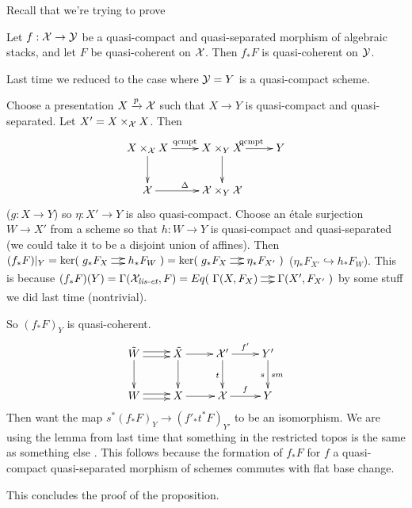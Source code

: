 
Recall that we're trying to prove
\begin{proposition}
  Let $f:\mathcal{X}\to \mathcal{Y}$ be a quasi-compact and quasi-separated morphism of
algebraic stacks, and let $F$ be quasi-coherent on $\mathcal{X}$. Then $f_*F$
is quasi-coherent on $\mathcal{Y}$.
\end{proposition}
Last time we reduced to the case where $\mathcal{Y}=Y$ is a quasi-compact
scheme.

Choose a presentation $X\xrightarrow p \mathcal{X}$ such that $X\to Y$ is
quasi-compact and quasi-separated. Let $X'=X\times_{\mathcal{X}} X$. Then
\[\xymatrix{
  X\times_\X X\ar[r]^{\text{qcmpt}}\ar[d] & X\times_Y X\ar[d]
\ar[r]^{\text{qcmpt}} & Y\\
  \X\ar[r]^\Delta & \X\times_Y \X
}\]
($g:X\to Y$) so $\eta:X'\to Y$ is also quasi-compact. Choose an
\'etale surjection $W\to X'$ from a scheme so that $h:W\to Y$ is
quasi-compact and quasi-separated (we could take it to be a disjoint
union of affines). Then $(f_*F)|_Y=\ker(\xymatrix@-1pc{g_*F_X
\ar@<.5ex>[r]\ar@<-.5ex>[r] & h_*F_W}) = \ker(\xymatrix@-1pc{g_*F_X
\ar@<.5ex>[r]\ar@<-.5ex>[r] & \eta_*F_{X'}})$
($\eta_*F_{X'}\hookrightarrow h_*F_W$).  This is because
$(f_*F)(Y)=\Ga(\X_\liset,
F)=Eq(\xymatrix@-1pc{\Ga(X,F_X)\ar@<.5ex>[r]\ar@<-.5ex>[r] &
\Ga(X',F_{X'}})$ by some stuff we did last time (nontrivial).

So $(f_*F)_Y$ is quasi-coherent.
\[\xymatrix{
  \tilde W \ar@<.5ex>[r]\ar@<-.5ex>[r]\ar[d] &\tilde X\ar[d]\ar[r]&
\X'\ar[r]^{f'}\ar[d]_t & Y'\ar[d]_s^{sm}\\
  W \ar@<.5ex>[r]\ar@<-.5ex>[r]& X\ar[r]&\X\ar[r]^f & Y
}\]
Then want the map $s^*(f_*F)_Y\to (f'_*t^*F)_{Y'}$ to be an
isomorphism. We are using the lemma from last time that something in
the restricted topos is the same as something else \anton{}. This
follows because the formation of $f_*F$ for $f$ a quasi-compact
quasi-separated morphism of schemes commutes with flat base change.

This concludes the proof of the proposition.

